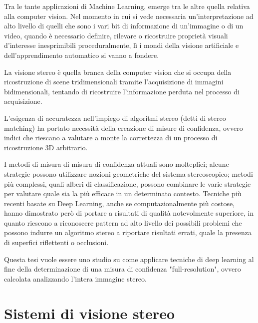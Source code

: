 \documentclass[12pt,a4paper]{report}
\begin{document}
Tra le tante applicazioni di Machine Learning, emerge tra le altre quella
relativa alla computer vision.  Nel momento in cui si vede necessaria
un'interpretazione ad alto livello di quelli che sono i vari bit di
informazione di un'immagine o di un video, quando è necessario definire,
rilevare o ricostruire proprietà visuali d'interesse inesprimibili
proceduralmente, lì i mondi della visione artificiale e dell'apprendimento
automatico si vanno a fondere.

La visione stereo è quella branca della computer vision che si occupa della
ricostruzione di scene tridimensionali tramite l'acquisizione di immagini
bidimensionali, tentando di ricostruire l'informazione perduta nel processo di
acquisizione. 

L'esigenza di accuratezza nell'impiego di algoritmi stereo (detti di stereo
matching) ha portato necessità della creazione di misure di confidenza, ovvero
indici che riescano a valutare a monte la correttezza di un processo di
ricostruzione 3D arbitrario.

I metodi di misura di misura di confidenza attuali sono molteplici; alcune
strategie possono utilizzare nozioni geometriche del sistema stereoscopico;
metodi più complessi, quali alberi di classificazione, possono combinare le
varie strategie per valutare quale sia la più efficace in un determinato
contesto.  Tecniche più recenti basate su Deep Learning, anche se
computazionalmente più costose, hanno dimostrato però di portare a risultati di
qualità notevolmente superiore, in quanto riescono a riconoscere pattern ad
alto livello dei possibili problemi che possono indurre un algoritmo stereo a
riportare risultati errati, quale la presenza di superfici riflettenti o
occlusioni.

Questa tesi vuole essere uno studio su come applicare tecniche di deep learning
al fine della determinazione di una misura di confidenza "full-resolution",
ovvero calcolata analizzando l'intera immagine stereo.

\chapter{Sistemi di visione stereo}

\medskip
 
\printbibliography
\end{document}
